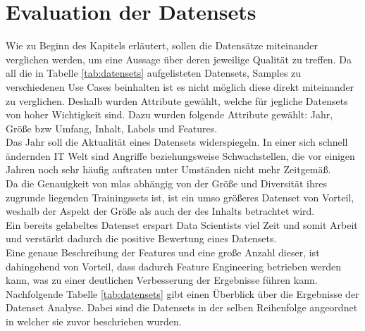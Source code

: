 \documentclass[
    12pt, %
    DIV10,
    ngerman, %
    a4paper, %
    oneside, %
    titlepage, %
    parskip=half, %
    headings=normal, %
    listof=totoc, %
    bibliography=totoc, %
    index=totoc, %
    captions=tableheading, %
    final %
]{scrreprt}
\begin{document}
\section{Evaluation der Datensets}
Wie zu Beginn des Kapitels erläutert, sollen die Datensätze miteinander verglichen werden, um eine Aussage über deren jeweilige Qualität zu treffen. Da all die in Tabelle \ref{tab:datensets} aufgelisteten Datensets, Samples zu verschiedenen Use Cases beinhalten ist es nicht möglich diese direkt miteinander zu verglichen. Deshalb wurden Attribute gewählt, welche für jegliche Datensets von hoher Wichtigkeit sind. Dazu wurden folgende Attribute gewählt: Jahr, Größe bzw Umfang, Inhalt, Labels und Features.\\
Das Jahr soll die Aktualität eines Datensets widerspiegeln. In einer sich schnell ändernden IT Welt sind Angriffe beziehungsweise Schwachstellen, die vor einigen Jahren noch sehr häufig auftraten unter Umständen nicht mehr Zeitgemäß.\\
Da die Genauigkeit von \ac{mlas} abhängig von der Größe und Diversität ihres zugrunde liegenden Trainingssets ist, ist ein umso größeres Datenset von Vorteil, weshalb der Aspekt der Größe als auch der des Inhalts betrachtet wird.\\
Ein bereits gelabeltes Datenset erspart Data Scientists viel Zeit und somit Arbeit und verstärkt dadurch die positive Bewertung eines Datensets.\\
Eine genaue Beschreibung der Features und eine große Anzahl dieser, ist dahingehend von Vorteil, dass dadurch Feature Engineering betrieben werden kann, was zu einer deutlichen Verbesserung der Ergebnisse führen kann.\\
Nachfolgende Tabelle \ref{tab:datensets} gibt einen Überblick über die Ergebnisse der Datenset Analyse. Dabei sind die Datensets in der selben Reihenfolge angeordnet in welcher sie zuvor beschrieben wurden.
\end{document}
